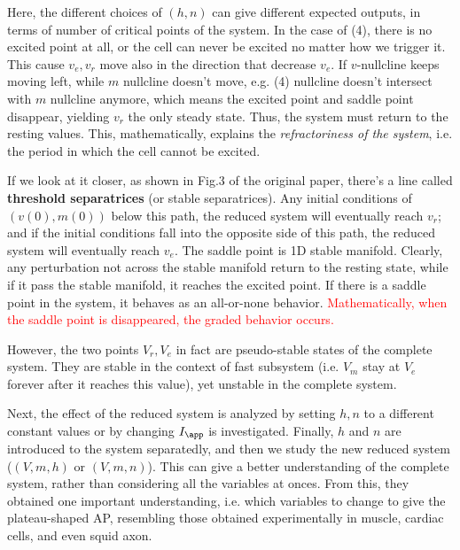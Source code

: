 Here, the different choices of $(h,n)$ can give different expected outputs, in
terms of number of critical points of the system.
In the case of (4), there is no excited point at all, or the cell can never be
excited no matter how we trigger it.
This cause $v_e, v_r$ move also in the direction that decrease $v_e$. If
$v$-nullcline keeps moving left, while $m$ nullcline doesn't move, e.g. (4)
nullcline doesn't intersect with $m$ nullcline anymore, which means the excited
point and saddle point disappear, yielding $v_r$ the only steady state. Thus,
the system must return to the resting values. This, mathematically, explains the
{\it refractoriness of the system}, i.e. the period in which the cell cannot be
excited.


If we look at it closer, as shown in Fig.3 of the original paper, there's a line
called {\bf threshold separatrices} (or stable separatrices). Any initial
conditions of $(v(0),m(0))$ below this path, the reduced system will eventually
reach $v_r$; and if the initial conditions fall into the opposite side of this
path, the reduced system will eventually reach $v_e$. The saddle point is 1D
stable manifold. Clearly, any perturbation not across the stable manifold return
to the resting state, while if it pass the stable manifold, it reaches the
excited point. If there is a saddle point in the system, it behaves as an
all-or-none behavior. \textcolor{red}{Mathematically, when the saddle point is
disappeared, the graded behavior occurs.}




\begin{mdframed}

However, the two points $V_r,V_e$ in fact are pseudo-stable states of the
complete system. They are stable in the context of fast subsystem (i.e. $V_m$
stay at $V_e$ forever after it reaches this value), yet unstable in the complete
system.
\end{mdframed}

Next, the effect of the reduced system is analyzed by setting $h,n$ to a
different constant values or by changing $I_\app$ is investigated. Finally, $h$
and $n$ are introduced to the system separatedly, and then we study the new
reduced system ($(V,m,h)$ or $(V,m,n)$). This can give a better understanding of
the complete system, rather than considering all the variables at onces. From
this, they obtained one important understanding, i.e. which variables to change
to give the plateau-shaped AP, resembling those obtained experimentally in
muscle, cardiac cells, and even squid axon.

